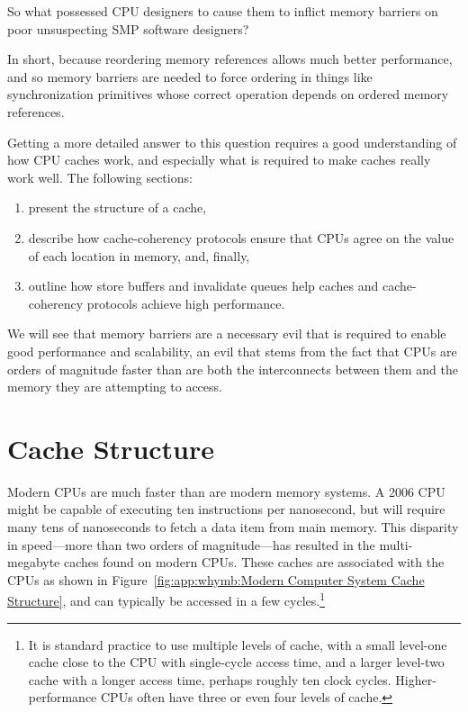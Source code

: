 

So what possessed CPU designers to cause them to inflict memory barriers
on poor unsuspecting SMP software designers?

In short, because reordering memory references allows much better performance,
and so memory barriers are needed to force ordering in things like
synchronization primitives whose correct operation depends on ordered
memory references.

Getting a more detailed answer to this question requires a good understanding
of how CPU caches work, and especially what is required to make
caches really work well.
The following sections:
\begin{enumerate}
\item	present the structure of a cache,
\item	describe how cache-coherency protocols ensure that CPUs agree
	on the value of each location in memory, and, finally,
\item	outline how store buffers and invalidate queues help
	caches and cache-coherency protocols achieve high performance.
\end{enumerate}
We will see that memory barriers are a necessary evil that is required
to enable good performance and scalability, an evil that stems from
the fact that CPUs are orders of magnitude faster than are both the
interconnects between them and the memory they are attempting to access.

\section{Cache Structure}
\label{sec:app:whymb:Cache Structure}

Modern CPUs are much faster than are modern memory systems.
A 2006 CPU might be capable of executing ten instructions per nanosecond,
but will require many tens of nanoseconds to fetch a data item from
main memory.
This disparity in speed---more than two orders of magnitude---has
resulted in the multi-megabyte caches found on modern CPUs.
These caches are associated with the CPUs as shown in
Figure~\ref{fig:app:whymb:Modern Computer System Cache Structure},
and can typically be accessed in a few cycles.\footnote{
	It is standard practice to use multiple levels of cache,
	with a small level-one cache close to the CPU with
	single-cycle access time, and a larger level-two cache
	with a longer access time, perhaps roughly ten clock cycles.
	Higher-performance CPUs often have three or even four levels
	of cache.}

